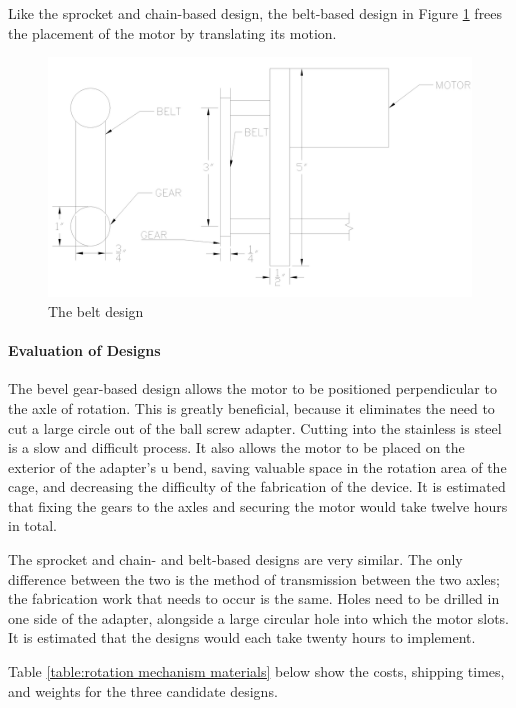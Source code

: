 \documentclass[11pt]{article}
\newcommand{\subsubsubsection}[1]{\paragraph{#1}\mbox{}}
\begin{document}
Like the sprocket and chain-based design, the belt-based design in Figure \ref{fig:belt} frees the placement of the motor by translating its motion.

\begin{figure}[H]
  \centering
  \includegraphics[width=0.6\linewidth]{res/belt.png}
  \caption{The belt design}
  \label{fig:belt}
\end{figure}

\subsubsubsection{Evaluation of Designs}

The bevel gear-based design allows the motor to be positioned perpendicular to the axle of rotation.
This is greatly beneficial, because it eliminates the need to cut a large circle out of the ball screw adapter.
Cutting into the stainless is steel is a slow and difficult process.
It also allows the motor to be placed on the exterior of the adapter’s u bend, saving valuable space in the rotation area of the cage, and decreasing the difficulty of the fabrication of the device.
It is estimated that fixing the gears to the axles and securing the motor would take twelve hours in total.

The sprocket and chain- and belt-based designs are very similar.
The only difference between the two is the method of transmission between the two axles; the fabrication work that needs to occur is the same.
Holes need to be drilled in one side of the adapter, alongside a large circular hole into which the motor slots.
It is estimated that the designs would each take twenty hours to implement.

Table \ref{table:rotation mechanism materials} below show the costs, shipping times, and weights for the three candidate designs.
\end{document}
